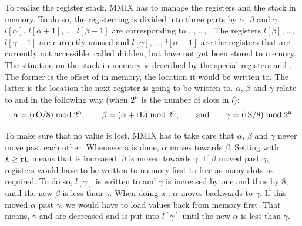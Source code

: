 To realize the register stack, MMIX has to manage the registers and the stack in memory. To do so, the registerring is divided into three parts by $\alpha$, $\beta$ and $\gamma$. $l[\alpha]$, $l[\alpha+1]$, \dots, $l[\beta-1]$ are corresponding to , , \dots, . The registers $l[\beta]$, \dots, $l[\gamma-1]$ are currently unused and $l[\gamma]$, \dots, $l[\alpha-1]$ are the registers that are currently not accessible, called \i{hidden}, but have not yet been stored to memory. The situation on the stack in memory is described by the special registers  and . The former is the offset of  in memory, \ie the location it would be written to. The latter is the location the next register is going to be written to. $\alpha$, $\beta$ and $\gamma$ relate to  and  in the following way (when $2^n$ is the number of slots in $l$):
$$\rm\alpha=(rO/8)\bmod2^n,\qquad \beta=(\alpha+rL)\bmod2^n,\qquad
\hbox{and}\qquad \gamma=(rS/8)\bmod2^n$$

To make sure that no value is lost, MMIX has to take care that $\alpha$, $\beta$ and $\gamma$ never move past each other. Whenever a  is done, $\alpha$ moves towards $\beta$. Setting  with ${\tt X} \ge {\tt rL}$ means that  is increased, \ie $\beta$ is moved towards $\gamma$. If $\beta$ moved past $\gamma$, registers would have to be written to memory first to free as many slots as required. To do so, $l[\gamma]$ is written to  and $\gamma$ is increased by one and thus  by 8, until the new $\beta$ is less than $\gamma$. When doing a , $\alpha$ moves backwards to $\gamma$. If this moved $\alpha$ past $\gamma$, we would have to load values back from memory first. That means, $\gamma$ and  are decreased and  is put into $l[\gamma]$ until the new $\alpha$ is less than $\gamma$. \citep[pg. 33]{mmix-doc}

